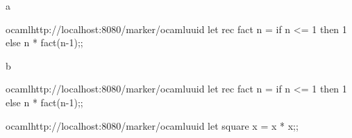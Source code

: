 
\newcommand{\studentemail}{spqr1@cam.ac.uk}



    \begin{question}{1}
        \begin{subquestion}{a}
            \begin{automarkable}{ocaml}{http://localhost:8080/marker/ocaml}{uuid}
                let rec fact n =
                  if n <= 1 then 1 else n * fact(n-1);;
            \end{automarkable}
        \end{subquestion}
        \begin{subquestion}{b}
            \begin{automarkable}{ocaml}{http://localhost:8080/marker/ocaml}{uuid}
                let rec fact n =
                  if n <= 1 then 1 else n * fact(n-1);;
            \end{automarkable}
        \end{subquestion}
    \end{question}

    \begin{question}{2}
        \begin{automarkable}{ocaml}{http://localhost:8080/marker/ocaml}{uuid}
            let square x = x * x;;
        \end{automarkable}
    \end{question}
